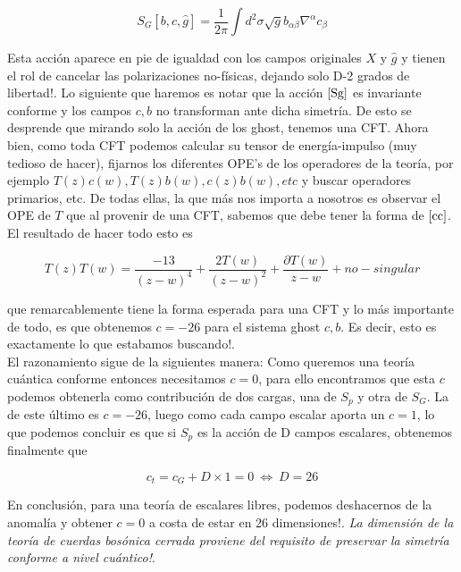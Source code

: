 \documentclass[]{article}
\begin{document}
\begin{equation}\label{Sg}
S_G[b,c,\hat{g}]=\frac{1}{2\pi} \int d^2\sigma\sqrt{g}b_{\alpha\beta}\nabla^{\alpha}c_{\beta}
\end{equation}

\noindent Esta acción aparece en pie de igualdad con los campos originales $ X $ y $ \hat{g} $ y tienen el rol de cancelar las polarizaciones no-físicas, dejando solo D-2 grados de libertad!.
Lo siguiente que haremos es notar que la acción $ \ref{Sg} $ es invariante conforme y los campos $ c,b $ no transforman ante dicha simetría. De esto se desprende que mirando solo la acción de los ghost, tenemos una CFT. Ahora bien, como toda CFT podemos calcular su tensor de energía-impulso (muy tedioso de hacer), fijarnos los diferentes OPE's de los operadores de la teoría, por ejemplo $T(z)c(w),T(z)b(w),c(z)b(w),etc $ y buscar operadores primarios, etc. De todas ellas, la que más nos importa a nosotros es observar el OPE de $ T $ que al provenir de una CFT, sabemos que debe tener la forma de $ \ref{cc} $. El resultado de hacer todo esto es

\begin{equation}\label{key}
T(z)T(w)= \frac{-13}{(z-w)^4}+\frac{2T(w)}{(z-w)^2}+\frac{\partial T(w)}{z-w} + no-singular
\end{equation}

\noindent que remarcablemente tiene la forma esperada para una CFT y lo más importante de todo, es que obtenemos $ c=-26 $ para el sistema ghost $ c,b $. Es decir, esto es exactamente lo que estabamos buscando!.\\

El razonamiento sigue de la siguientes manera: Como queremos una teoría cuántica conforme entonces necesitamos $ c=0 $, para ello encontramos que esta $ c $ podemos obtenerla como contribución de dos cargas, una de $ S_p $ y otra de $ S_G $. La de este último es $ c=-26 $, luego como cada campo escalar aporta un $ c=1 $, lo que podemos concluir es que si $ S_p $ es la acción de D campos escalares, obtenemos finalmente que 

\begin{equation}\label{key}
c_t=c_G + D\times1=0 \ \iff \ D=26
\end{equation}

En conclusión, para una teoría de escalares libres, podemos deshacernos de la anomalía y obtener $ c=0 $ a costa de estar en 26 dimensiones!. \textit{La dimensión de la teoría de cuerdas bosónica cerrada proviene del requisito de preservar la simetría conforme a nivel cuántico!}.\\
\end{document}
